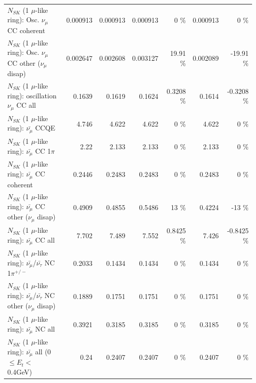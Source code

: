 \begin{table}
\begin{tabular}{| l | r | r | r  r | r  r |}
                        $N_{SK}$ (1 $\mu$-like ring): Osc. $\nu_\mu$ CC coherent &        0.000913 &        0.000913 &        0.000913 &        0 \%  &        0.000913 &        0 \%  \\ 
         $N_{SK}$ (1 $\mu$-like ring): Osc. $\nu_\mu$ CC other ($\nu_\mu$ disap) &        0.002647 &        0.002608 &        0.003127 &    19.91 \%  &        0.002089 &   -19.91 \%  \\ 
                      $N_{SK}$ (1 $\mu$-like ring): oscillation $\nu_\mu$ CC all &          0.1639 &          0.1619 &          0.1624 &   0.3208 \%  &          0.1614 &  -0.3208 \%  \\ 
\hline
\hline
                              $N_{SK}$ (1 $\mu$-like ring): $\bar{\nu_\mu}$ CCQE &           4.746 &           4.622 &           4.622 &        0 \%  &           4.622 &        0 \%  \\ 
                         $N_{SK}$ (1 $\mu$-like ring): $\bar{\nu_\mu}$ CC 1$\pi$ &            2.22 &           2.133 &           2.133 &        0 \%  &           2.133 &        0 \%  \\ 
                       $N_{SK}$ (1 $\mu$-like ring): $\bar{\nu_\mu}$ CC coherent &          0.2446 &          0.2483 &          0.2483 &        0 \%  &          0.2483 &        0 \%  \\ 
        $N_{SK}$ (1 $\mu$-like ring): $\bar{\nu_\mu}$ CC other ($\nu_\mu$ disap) &          0.4909 &          0.4855 &          0.5486 &       13 \%  &          0.4224 &      -13 \%  \\ 
                          $N_{SK}$ (1 $\mu$-like ring): $\bar{\nu_{\mu}}$ CC all &           7.702 &           7.489 &           7.552 &   0.8425 \%  &           7.426 &  -0.8425 \%  \\ 
\hline
  $N_{SK}$ (1 $\mu$-like ring): $\bar{\nu_\mu}$/$\bar{\nu_\tau}$ NC 1$\pi^{+/-}$ &          0.2033 &          0.1434 &          0.1434 &        0 \%  &          0.1434 &        0 \%  \\ 
$N_{SK}$ (1 $\mu$-like ring): $\bar{\nu_\mu}$/$\bar{\nu_\tau}$ NC other ($\nu_\mu$ disap) &          0.1889 &          0.1751 &          0.1751 &        0 \%  &          0.1751 &        0 \%  \\ 
                          $N_{SK}$ (1 $\mu$-like ring): $\bar{\nu_{\mu}}$ NC all &          0.3921 &          0.3185 &          0.3185 &        0 \%  &          0.3185 &        0 \%  \\ 
\hline
   $N_{SK}$ (1 $\mu$-like ring): $\bar{\nu_{\mu}}$ all (0 $\leq E_{t} <$ 0.4GeV) &            0.24 &          0.2407 &          0.2407 &        0 \%  &          0.2407 &        0 \%  \\ 

\end{tabular}
\end{table}
